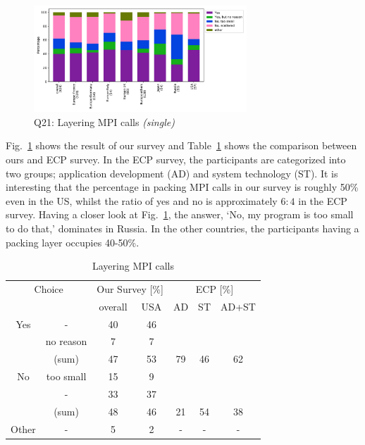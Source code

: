 \documentclass[conference,10pt,letterpaper]{IEEEtran}
\def\myquote#1{`#1'}
\begin{document}
\begin{figure}[htb]
\begin{center}
\includegraphics[width=8cm]{Figs/Q21.pdf}
\caption{Q21: Layering MPI calls {\it(single)}}
\label{fig:layering-mpi-calls}
\end{center}
\end{figure}

Fig.~\ref{fig:layering-mpi-calls} shows the result of our survey and
Table~\ref{tab:layering-mpi-calls} shows the comparison between ours
and ECP survey. In the ECP survey, the participants are categorized
into two groups; application development (AD) and system technology
(ST). It is interesting that the percentage in packing MPI calls
in our survey is roughly 50\% even in the US, whilst the ratio of yes
and no is approximately $6:4$ in the ECP survey.
Having a closer look at Fig.~\ref{fig:layering-mpi-calls}, the answer,
\myquote{No, my program is too small to do that,} dominates in Russia. In
the other countries, the participants having a packing layer occupies
40-50\%. 

\begin{table}[htb]%
\begin{center}%
\caption{Layering MPI calls}\label{tab:layering-mpi-calls}%
\begin{tabular}{c|c||c|c||c|c|c}%
\hline%
\multicolumn{2}{c||}{Choice} & \multicolumn{2}{c||}{Our Survey [\%]} &
\multicolumn{3}{c}{ECP [\%]} \\
\cline{3-7}%
\multicolumn{2}{c||}{} & overall & USA & AD & ST & AD+ST \\
\hline%
\hline%
Yes & - & 40 & 46 & & & \\
& no reason & 7 & 7 & & & \\
\cline{2-4}%
 & (sum) & 47 & 53 &  79 & 46 & 62 \\
\hline%
\hline%
No & too small & 15 & 9 & & & \\
& - & 33 & 37 & & & \\
\cline{2-4}%
 & (sum) & 48 & 46 & 21 & 54 & 38 \\
\hline%
Other & - & 5 & 2 & - & - & - \\
\hline%
\end{tabular}%
\end{center}%
\end{table}%
\end{document}
